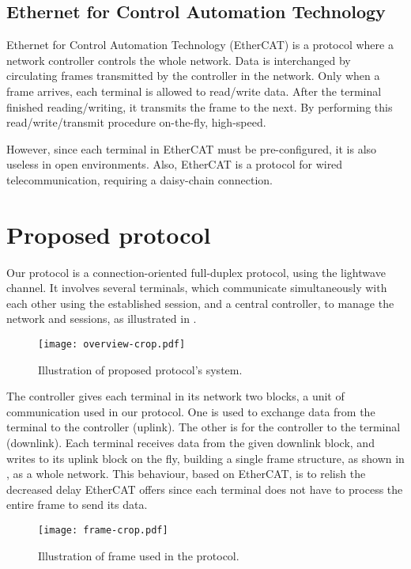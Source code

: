﻿\documentclass[twocolumn,9pt]{ltjsarticle}
\renewcommand{\ref}{\Cref}
\begin{document}
\subsection{Ethernet for Control Automation Technology}
Ethernet for Control Automation Technology (EtherCAT) is a protocol where a network controller controls the whole network.
Data is interchanged by circulating frames transmitted by the controller in the network.
Only when a frame arrives, each terminal is allowed to read/write data.
After the terminal finished reading/writing, it transmits the frame to the next.
By performing this read/write/transmit procedure on-the-fly, high-speed.

However, since each terminal in EtherCAT must be pre-configured, it is also useless in open environments.
Also, EtherCAT is a protocol for wired telecommunication, requiring a daisy-chain connection.

\section{Proposed protocol}
Our protocol is a connection-oriented full-duplex protocol, using the lightwave channel.
It involves several terminals, which communicate simultaneously with each other using the established session, and a central controller, to manage the network and sessions, as illustrated in \ref{fig:overview}.

\begin{figure}[tb]
  \centering
  \texttt{[image: overview-crop.pdf]}
  \caption{\label{fig:overview}
    Illustration of proposed protocol's system.
  }
\end{figure}

The controller gives each terminal in its network two blocks, a unit of communication used in our protocol.
One is used to exchange data from the terminal to the controller (uplink).
The other is for the controller to the terminal (downlink).
Each terminal receives data from the given downlink block, and writes to its uplink block on the fly, building a single frame structure, as shown in \ref{fig:frame}, as a whole network.
This behaviour, based on EtherCAT, is to relish the decreased delay EtherCAT offers since each terminal does not have to process the entire frame to send its data.
\begin{figure}[tb]
  \centering
  \texttt{[image: frame-crop.pdf]}
  \caption{\label{fig:frame}
    Illustration of frame used in the protocol.
  }
\end{figure}
\end{document}
